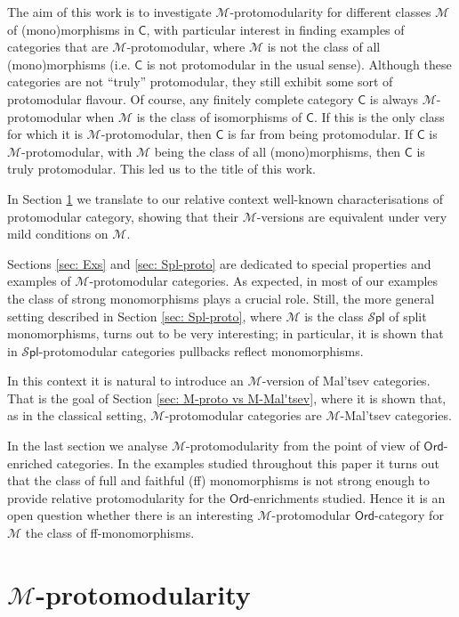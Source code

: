 \documentclass[10pt,a4paper]{amsart}
\theoremstyle{plain}
\theoremstyle{definition}
\theoremstyle{remark}
\newcommand{\C}{\ensuremath{\mathsf{C}}}
\newcommand{\Ord}{\ensuremath{\mathsf{Ord}}}
\newcommand{\M}{\ensuremath{\mathscr{M}}}
\newcommand{\Spl}{\ensuremath{\mathscr{S}\mathsf{pl}}}
\begin{document}
The aim of this work is to investigate $\M$-protomodularity for different classes $\M$ of (mono)mor\-phi\-sms in $\C$, with particular interest in finding examples of categories that are $\M$-protomodular, where $\M$ is not the class of all (mono)morphisms (i.e. $\C$ is not protomodular in the usual sense). Although these categories are not ``truly'' protomodular, they still exhibit some sort of protomodular flavour. Of course, any finitely complete category $\C$ is always $\M$-protomodular when $\M$ is the class of isomorphisms of $\C$. If this is the only class for which it is $\M$-protomodular, then $\C$ is far from being protomodular. If $\C$ is $\M$-protomodular, with $\M$ being the class of all (mono)morphisms, then $\C$ is truly protomodular. This led us to the title of this work.


In Section \ref{sec: M-protomodularity} we translate to our relative context well-known characterisations of protomodular category, showing that their $\M$-versions are equivalent under very mild conditions on $\M$.


Sections \ref{sec: Exs} and \ref{sec: Spl-proto} are dedicated to special properties and examples of $\M$-protomodular categories. As expected, in most of our examples the class of strong monomorphisms plays a crucial role. Still, the more general setting described in Section \ref{sec: Spl-proto}, where $\M$ is the class $\Spl$ of split monomorphisms, turns out to be very interesting; in particular, it is shown that in $\Spl$-protomodular categories pullbacks reflect monomorphisms.

In this context it is natural to introduce an $\M$-version of Mal'tsev categories. That is the goal of Section \ref{sec: M-proto vs M-Mal'tsev}, where it is shown that, as in the classical setting, $\M$-protomodular categories are $\M$-Mal'tsev categories.

In the last section we analyse $\M$-protomodularity from the point of view of $\Ord$-enriched categories. In the examples studied throughout this paper it turns out that the class of full and faithful (ff) monomorphisms is not strong enough to provide relative protomodularity for the $\Ord$-enrichments studied. Hence it is an open question whether there is an interesting $\M$-protomodular $\Ord$-category for $\M$ the class of ff-monomorphisms.



\section{$\M$-protomodularity}\label{sec: M-protomodularity}
\end{document}
